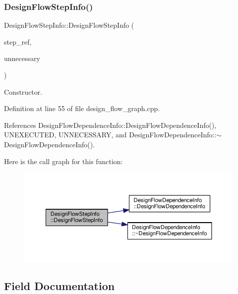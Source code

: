 \subsubsection{\texorpdfstring{Design\+Flow\+Step\+Info()}{DesignFlowStepInfo()}}
{\footnotesize\ttfamily Design\+Flow\+Step\+Info\+::\+Design\+Flow\+Step\+Info (\begin{DoxyParamCaption}\item[{const \hyperlink{design__flow__step_8hpp_a9dd6b4474ddf52d41a78b1aaa12ae6c8}{Design\+Flow\+Step\+Ref}}]{step\+\_\+ref,  }\item[{const bool}]{unnecessary }\end{DoxyParamCaption})}



Constructor. 



Definition at line 55 of file design\+\_\+flow\+\_\+graph.\+cpp.



References Design\+Flow\+Dependence\+Info\+::\+Design\+Flow\+Dependence\+Info(), U\+N\+E\+X\+E\+C\+U\+T\+ED, U\+N\+N\+E\+C\+E\+S\+S\+A\+RY, and Design\+Flow\+Dependence\+Info\+::$\sim$\+Design\+Flow\+Dependence\+Info().

Here is the call graph for this function\+:
\nopagebreak
\begin{figure}[H]
\begin{center}
\leavevmode
\includegraphics[width=350pt]{d9/df2/structDesignFlowStepInfo_a504fd2b32c305fc3adf51b7e1a223523_cgraph}
\end{center}
\end{figure}


\subsection{Field Documentation}
\mbox{\label{structDesignFlowStepInfo_a9e0186491f1e2dc72987359665b4cd60}} 

